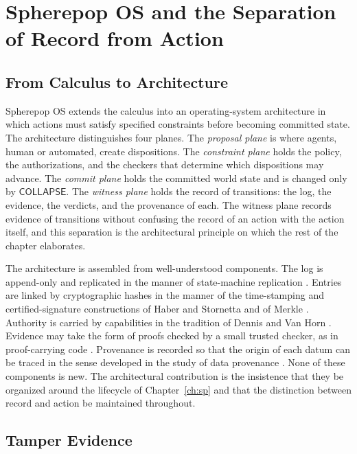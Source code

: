 \documentclass[11pt,twoside,openright]{book}
\theoremstyle{plain}
\theoremstyle{definition}
\theoremstyle{remark}
\newcommand{\collapse}{\mathsf{COLLAPSE}}
\begin{document}
\chapter{Spherepop OS and the Separation of Record from Action}
\label{ch:os}

\section{From Calculus to Architecture}

Spherepop OS extends the calculus into an operating-system architecture in which actions must satisfy specified constraints before becoming committed state. The architecture distinguishes four planes. The \emph{proposal plane} is where agents, human or automated, create dispositions. The \emph{constraint plane} holds the policy, the authorizations, and the checkers that determine which dispositions may advance. The \emph{commit plane} holds the committed world state and is changed only by $\collapse$. The \emph{witness plane} holds the record of transitions: the log, the evidence, the verdicts, and the provenance of each. The witness plane records evidence of transitions without confusing the record of an action with the action itself, and this separation is the architectural principle on which the rest of the chapter elaborates.

The architecture is assembled from well-understood components. The log is append-only and replicated in the manner of state-machine replication \cite{schneider1990}. Entries are linked by cryptographic hashes in the manner of the time-stamping and certified-signature constructions of Haber and Stornetta and of Merkle \cite{haber1991,merkle1989}. Authority is carried by capabilities in the tradition of Dennis and Van Horn \cite{dennisvanhorn1966}. Evidence may take the form of proofs checked by a small trusted checker, as in proof-carrying code \cite{necula1997}. Provenance is recorded so that the origin of each datum can be traced in the sense developed in the study of data provenance \cite{buneman2001}. None of these components is new. The architectural contribution is the insistence that they be organized around the lifecycle of Chapter~\ref{ch:sp} and that the distinction between record and action be maintained throughout.

\section{Tamper Evidence}
\end{document}
